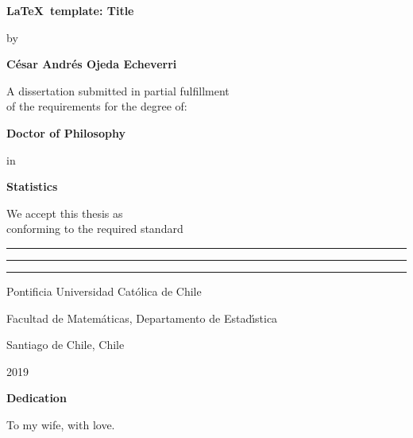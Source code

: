 \begin{center}
\textbf{\huge \LaTeX\ template: Title}\vspace*{1.0cm}

by\vspace*{0.5cm}

\Large\textbf{C\'{e}sar Andr\'{e}s Ojeda Echeverri}\vspace*{1.0cm}

\small A dissertation submitted in partial fulfillment\\
of the requirements for the degree of:\vspace*{1.0cm}

\textbf{Doctor of Philosophy}\vspace*{0.5cm}

in\vspace*{0.5cm}

\textbf{Statistics}\vspace*{1.5cm}

We accept this thesis as\\
conforming to the required standard\vspace*{1.0cm}

\rule{10cm}{1pt}\vspace*{0.7cm}
\rule{10cm}{1pt}\vspace*{0.7cm}
\rule{10cm}{1pt}\vspace*{2.5cm}

Pontificia Universidad Cat\'{o}lica de Chile

Facultad de Matem\'{a}ticas, Departamento de Estad\'{\i}stica

Santiago de Chile, Chile

2019
\end{center}

\newpage

\thispagestyle{empty}

\vspace*{1cm}

\textbf{\LARGE Dedication}\vspace*{4.0cm}

\begin{flushright}
\begin{minipage}{8cm}
To my wife, with love.
\end{minipage}
\end{flushright}

